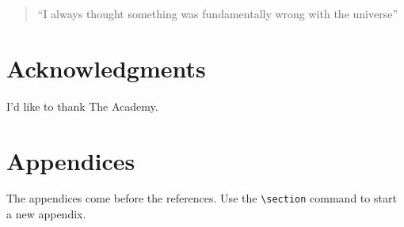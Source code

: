 \documentclass[12pt,letterpaper]{article}
\begin{document}
\begin{quotation}
``I always thought something was fundamentally wrong with the universe'' \cite{adams1995hitchhiker}
\end{quotation}

\section*{Acknowledgments}

I'd like to thank The Academy.

\appendix

\section{Appendices}

The appendices come before the references.  Use the \verb/\section/ command to start a new appendix.



\end{document}
